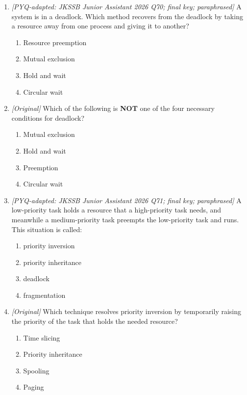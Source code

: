 \begin{enumerate}[label=\textbf{Q\arabic*.}, leftmargin=*]
\item \textit{[PYQ-adapted: JKSSB Junior Assistant 2026 Q70; final key;
  paraphrased]} A system is in a deadlock. Which method recovers from the
  deadlock by taking a resource away from one process and giving it to
  another?
  \begin{enumerate}[label=\Alph*.]
    \item Resource preemption
    \item Mutual exclusion
    \item Hold and wait
    \item Circular wait
  \end{enumerate}
\item \textit{[Original]} Which of the following is \textbf{NOT} one of the
  four necessary conditions for deadlock?
  \begin{enumerate}[label=\Alph*.]
    \item Mutual exclusion
    \item Hold and wait
    \item Preemption
    \item Circular wait
  \end{enumerate}
\item \textit{[PYQ-adapted: JKSSB Junior Assistant 2026 Q71; final key;
  paraphrased]} A low-priority task holds a resource that a high-priority
  task needs, and meanwhile a medium-priority task preempts the low-priority
  task and runs. This situation is called:
  \begin{enumerate}[label=\Alph*.]
    \item priority inversion
    \item priority inheritance
    \item deadlock
    \item fragmentation
  \end{enumerate}
\item \textit{[Original]} Which technique resolves priority inversion by
  temporarily raising the priority of the task that holds the needed
  resource?
  \begin{enumerate}[label=\Alph*.]
    \item Time slicing
    \item Priority inheritance
    \item Spooling
    \item Paging
  \end{enumerate}

\end{enumerate}

